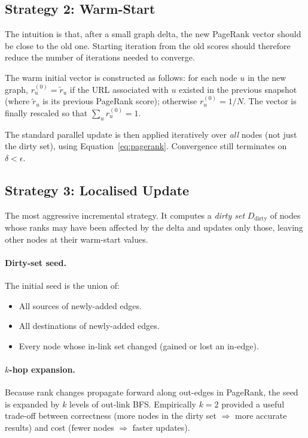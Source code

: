 \documentclass[11pt,a4paper]{article}
\begin{document}
\subsection{Strategy 2: Warm-Start}
The intuition is that, after a small graph delta, the new PageRank
vector should be close to the old one. Starting iteration from the old
scores should therefore reduce the number of iterations needed to
converge.

The warm initial vector is constructed as follows: for each node $u$ in
the new graph, $r_u^{(0)} = \tilde{r}_u$ if the URL associated with $u$
existed in the previous snapshot (where $\tilde{r}_u$ is its previous
PageRank score); otherwise $r_u^{(0)} = 1/N$. The vector is finally
rescaled so that $\sum_u r_u^{(0)} = 1$.

The standard parallel update is then applied iteratively over
\emph{all} nodes (not just the dirty set), using
Equation~\ref{eq:pagerank}. Convergence still terminates on
$\delta < \epsilon$.

\subsection{Strategy 3: Localised Update}
The most aggressive incremental strategy. It computes a \emph{dirty
set} $D_{\text{dirty}}$ of nodes whose ranks may have been affected by
the delta and updates only those, leaving other nodes at their
warm-start values.

\paragraph{Dirty-set seed.} The initial seed is the union of:
\begin{itemize}
    \item All sources of newly-added edges.
    \item All destinations of newly-added edges.
    \item Every node whose in-link set changed (gained or lost an
    in-edge).
\end{itemize}

\paragraph{$k$-hop expansion.} Because rank changes propagate forward
along out-edges in PageRank, the seed is expanded by $k$ levels of
out-link BFS. Empirically $k=2$ provided a useful trade-off between
correctness (more nodes in the dirty set $\Rightarrow$ more accurate
results) and cost (fewer nodes $\Rightarrow$ faster updates).
\end{document}
